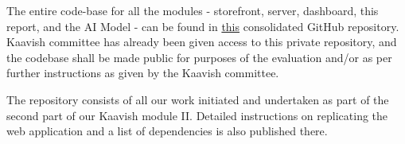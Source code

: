 The entire code-base for all the modules - storefront, server, dashboard, this report, and the AI Model - can be found in \href{https://github.com/osama-usuf/Kaavish-II-PORS}{this} consolidated GitHub repository. Kaavish committee has already been given access to this private repository, and the codebase shall be made public for purposes of the evaluation and/or as per further instructions as given by the Kaavish committee.

The repository consists of all our work initiated and undertaken as part of the second part of our Kaavish module II. Detailed instructions on replicating the web application and a list of dependencies is also published there.

